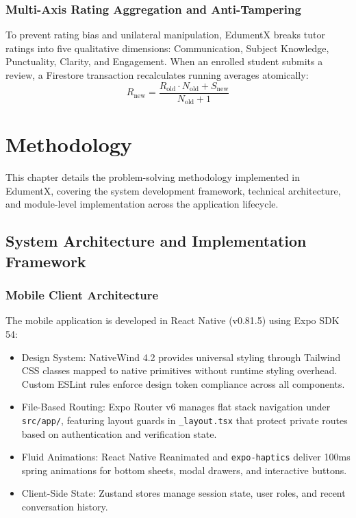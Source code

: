 \documentclass[12pt]{report}
\begin{document}
\subsection{Multi-Axis Rating Aggregation and Anti-Tampering}
To prevent rating bias and unilateral manipulation, EdumentX breaks tutor ratings into five qualitative dimensions: Communication, Subject Knowledge, Punctuality, Clarity, and Engagement. When an enrolled student submits a review, a Firestore transaction recalculates running averages atomically:
\begin{equation}
R_{\text{new}} = \frac{R_{\text{old}} \cdot N_{\text{old}} + S_{\text{new}}}{N_{\text{old}} + 1}
\end{equation}

\newpage
\chapter{Methodology}

This chapter details the problem-solving methodology implemented in EdumentX, covering the system development framework, technical architecture, and module-level implementation across the application lifecycle.

\section{System Architecture and Implementation Framework}

\subsection{Mobile Client Architecture}
The mobile application is developed in React Native (v0.81.5) using Expo SDK 54:
\begin{itemize}
\item Design System: NativeWind 4.2 provides universal styling through Tailwind CSS classes mapped to native primitives without runtime styling overhead. Custom ESLint rules enforce design token compliance across all components.
\item File-Based Routing: Expo Router v6 manages flat stack navigation under \texttt{src/app/}, featuring layout guards in \texttt{\_layout.tsx} that protect private routes based on authentication and verification state.
\item Fluid Animations: React Native Reanimated and \texttt{expo-haptics} deliver 100ms spring animations for bottom sheets, modal drawers, and interactive buttons.
\item Client-Side State: Zustand stores manage session state, user roles, and recent conversation history.
\end{itemize}
\end{document}
